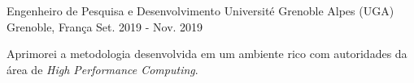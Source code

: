 \begin{cventries}
    \cventry
    {Engenheiro de Pesquisa e Desenvolvimento} %
    {Université Grenoble Alpes (UGA)} %
    {Grenoble, França} %
    {Set. 2019 - Nov. 2019} %
    {
        \begin{cvitems} %
        \item{Aprimorei a metodologia desenvolvida em um ambiente rico
            com autoridades da área de \textit{High Performance Computing}.}
        \end{cvitems}
    }


\end{cventries}
